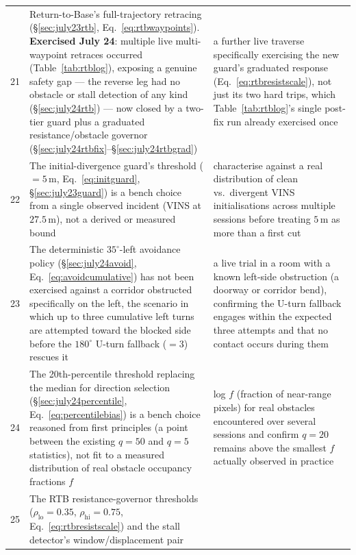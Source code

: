 \begin{longtable}{@{}cL{6.2cm}L{6.8cm}@{}}
21 & Return-to-Base's full-trajectory retracing (\S\ref{sec:july23rtb},
    Eq.~\ref{eq:rtbwaypoints}). \textbf{Exercised July 24}: multiple live
    multi-waypoint retraces occurred (Table~\ref{tab:rtblog}), exposing a
    genuine safety gap — the reverse leg had no obstacle or stall detection
    of any kind (\S\ref{sec:july24rtb}) — now closed by a two-tier guard
    plus a graduated resistance/obstacle governor
    (\S\ref{sec:july24rtbfix}--\S\ref{sec:july24rtbgrad}) &
    a further live traverse specifically exercising the new guard's
    graduated response (Eq.~\ref{eq:rtbresistscale}), not just its two hard
    trips, which Table~\ref{tab:rtblog}'s single post-fix run already
    exercised once \\
22 & The initial-divergence guard's threshold
    ($=5$\,m, Eq.~\ref{eq:initguard},
    \S\ref{sec:july23guard}) is a bench choice from a single observed
    incident (VINS at $27.5$\,m), not a derived or measured bound &
    characterise against a real distribution of clean vs.\ divergent VINS
    initialisations across multiple sessions before treating $5$\,m as more
    than a first cut \\
23 & The deterministic $35^\circ$-left avoidance policy
    (\S\ref{sec:july24avoid}, Eq.~\ref{eq:avoidcumulative}) has not been
    exercised against a corridor obstructed specifically on the left, the
    scenario in which up to three cumulative left turns are attempted
    toward the blocked side before the $180^\circ$ U-turn fallback
    ($=3$) rescues it &
    a live trial in a room with a known left-side obstruction (a doorway
    or corridor bend), confirming the U-turn fallback engages within the
    expected three attempts and that no contact occurs during them \\
24 & The 20th-percentile threshold replacing the median for direction
    selection (\S\ref{sec:july24percentile}, Eq.~\ref{eq:percentilebias})
    is a bench choice reasoned from first principles (a point between the
    existing $q=50$ and $q=5$ statistics), not fit to a measured
    distribution of real obstacle occupancy fractions $f$ &
    log $f$ (fraction of near-range pixels) for real obstacles encountered
    over several sessions and confirm $q=20$ remains above the smallest
    $f$ actually observed in practice \\
25 & The RTB resistance-governor thresholds
    ($\rho_{\text{lo}}=0.35$, $\rho_{\text{hi}}=0.75$, Eq.~\ref{eq:rtbresistscale})
    and the stall detector's window/displacement pair

\end{longtable}
